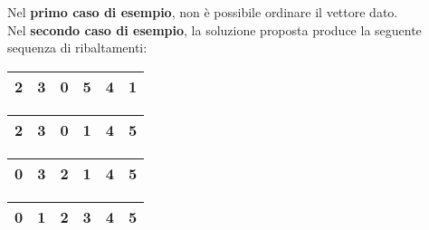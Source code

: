

\Examples

\begin{example}
%
%
\end{example}



\Explanation

Nel \textbf{primo caso di esempio}, non \`e possibile ordinare il vettore dato.\\[2mm]

Nel \textbf{secondo caso di esempio}, la soluzione proposta produce la seguente sequenza di ribaltamenti:
\begin{center}
\begin{tabular}{|c|c|c|c|c|c|}
\hline
2 & 3 & 0 & 5 & 4 & 1\\
\hline
\end{tabular}
\end{center}
\begin{center}
\begin{tabular}{|c|c|c|c|c|c|}
\hline
2 & 3 & 0 & 1 & 4 & 5\\
\hline
\end{tabular}
\end{center}
\begin{center}
\begin{tabular}{|c|c|c|c|c|c|}
\hline
0 & 3 & 2 & 1 & 4 & 5\\
\hline
\end{tabular}
\end{center}
\begin{center}
\begin{tabular}{|c|c|c|c|c|c|}
\hline
0 & 1 & 2 & 3 & 4 & 5\\
\hline
\end{tabular}
\end{center}
